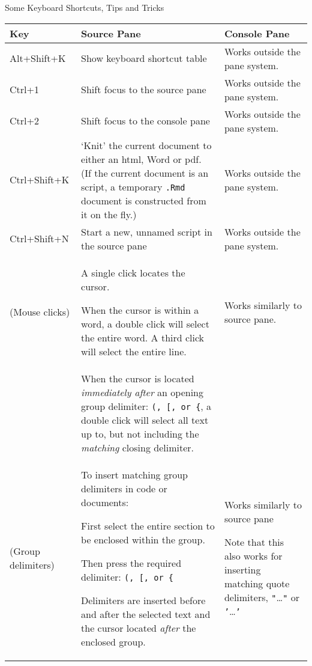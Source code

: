 \documentclass[11pt]{article}
\begin{document}
\begin{center}
  \Large Some \RStudio  Keyboard Shortcuts, Tips and Tricks
\end{center}


\begin{xltabular}{1.0\linewidth}[!htp]{@{}lXX@{}}
  \toprule
  \textbf{Key} & \textbf{Source Pane} & \textbf{Console Pane}\\
  \midrule Alt+Shift+K & Show keyboard shortcut table &
  Works outside the pane system.\\
  Ctrl+1 & Shift focus to the source pane&
  Works outside  the pane system.\\
  Ctrl+2 & Shift focus to the console pane& Works outside
  the pane system.\\
  Ctrl+Shift+K & `Knit' the current document to either an html, Word
  or pdf.  (If the current document is an \R script, a temporary
  \texttt{.Rmd} document is constructed from it on the fly.)  & Works
  outside the pane system.\\
  Ctrl+Shift+N & Start a new, unnamed \R script in the source pane&
  Works outside the   pane system.\\
  (Mouse clicks) & A single click locates the cursor.\par
  When the cursor is within a word, a double click will select the
  entire word.  A third click will select the entire line. & Works
  similarly to source pane.\\
  & When the cursor is located \emph{immediately after} an opening
  group delimiter: \texttt{(, [, or \{}, a double click will select
  all text up to, but not including the \emph{matching} closing
  delimiter. & \\
  (Group delimiters) & To insert matching group delimiters in code or
  documents:\par
  First select the entire section to be enclosed within the group.\par
  Then press the required delimiter: \texttt{(, [, or \{}\par
  Delimiters are inserted before and after the selected text and the
  cursor located \emph{after} the enclosed group.& Works similarly to
  source pane\par
  Note that this also works for inserting matching quote delimiters,
  \texttt{"}\dots\texttt{"} or \texttt{'}\dots\texttt{'}\\

\end{xltabular}
\end{document}

